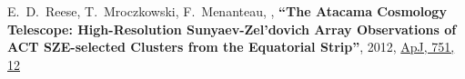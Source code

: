 \documentclass{article}
\def\myself{\textbf{\color{red} C.~Sif\'on}}
\begin{document}
\begin{etaremune}
\item
E.~D.~Reese, T.~Mroczkowski, F.~Menanteau, ,
\textbf{``The Atacama Cosmology Telescope: High-Resolution Sunyaev-Zel'dovich Array Observations of ACT
SZE-selected Clusters from the Equatorial Strip''}, 
2012, \href{http://adsabs.harvard.edu/adsabs/abs/2012ApJ...751...12R}{ApJ, 751, 12}


\end{etaremune}
\end{document}
